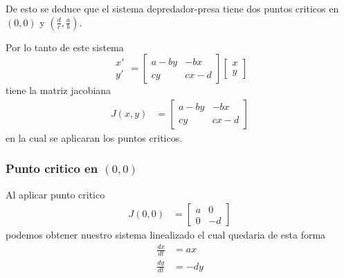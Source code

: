 \documentclass{report}
\begin{document}
De esto se deduce que el sistema depredador-presa tiene dos puntos criticos en $(0,0)$ y  $(\frac{d}{c},\frac{a}{b})$.

Por lo tanto de este sistema
\begin{equation*}
\begin{array}{c}
x' \\
y'
\end{array} 
=
\left[
\begin{matrix}
a-by &-bx\\
cy &cx-d
\end{matrix}\right]
\left[\begin{array}{c}
x\\
y
\end{array}\right]
\end{equation*}
tiene la matriz jacobiana
\begin{align*}
J(x,y)&=
\left[
\begin{matrix}
a-by &-bx\\
cy &cx-d
\end{matrix}\right]
\end{align*}
en la cual se aplicaran los puntos criticos.

\subsubsection{Punto critico en $(0,0)$}
Al aplicar punto critico
\begin{align}
J(0,0)&=
\left[
\begin{matrix}
a &0\\
0 &-d
\end{matrix}\right]
\end{align}
podemos obtener nuestro sistema linealizado el cual quedaria de esta forma
\begin{align}
\frac{dx}{dt}&= ax \nonumber\\
\frac{dy}{dt}&= -dy \label{eq:sisPC1}
\end{align}

\end{document}
